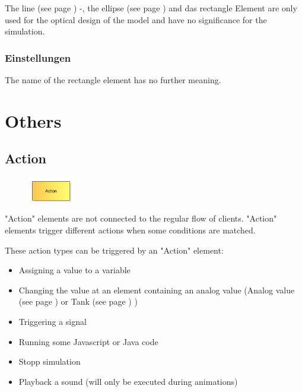 The line (see page \pageref{ref:ModelElementLine}) -, the ellipse (see page \pageref{ref:ModelElementEllipse}) and
das rectangle Element are only used for the optical design of the model and have no significance for the simulation.

\subsection*{Einstellungen}

The name of the rectangle element has no further meaning.





\chapter{Others}

\section{Action}
\label{ref:ModelElementAction}

\begin{figure}
\vspace{-22pt}
\includegraphics[width=2cm]{imageModelElementAction.png}
\vspace{-22pt}
\end{figure}

"Action" elements are not connected to the regular flow of clients.
"Action" elements trigger different actions when some conditions are matched.

These action types can be triggered by an "Action" element:

\begin{itemize}
  \item Assigning a value to a variable 
  \item Changing the value at an element containing an analog value
  (Analog value (see page \pageref{ref:ModelElementAnalogValue}) or Tank (see page \pageref{ref:ModelElementTank}) )
  \item Triggering a signal 
  \item Running some Javascript or Java code 
  \item Stopp simulation 
  \item Playback a sound (will only be executed during animations) 
\end{itemize}

